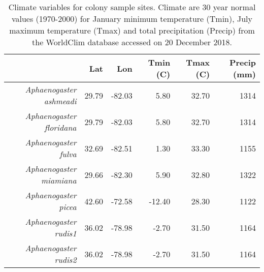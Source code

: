 \begin{table}[ht]
\centering
\begin{tabular}{rrrrrr}
  \hline
 & Lat & Lon & Tmin (C) & Tmax (C) & Precip (mm) \\ 
  \hline
{\emph{Aphaenogaster ashmeadi}} & 29.79 & -82.03 & 5.80 & 32.70 & 1314 \\ 
  {\emph{Aphaenogaster floridana}} & 29.79 & -82.03 & 5.80 & 32.70 & 1314 \\ 
  {\emph{Aphaenogaster fulva}} & 32.69 & -82.51 & 1.30 & 33.30 & 1155 \\ 
  {\emph{Aphaenogaster miamiana}} & 29.66 & -82.30 & 5.90 & 32.80 & 1322 \\ 
  {\emph{Aphaenogaster picea}} & 42.60 & -72.58 & -12.40 & 28.30 & 1122 \\ 
  {\emph{Aphaenogaster rudis1}} & 36.02 & -78.98 & -2.70 & 31.50 & 1164 \\ 
  {\emph{Aphaenogaster rudis2}} & 36.02 & -78.98 & -2.70 & 31.50 & 1164 \\ 
   \hline
\end{tabular}
\caption{Climate variables for colony sample sites. Climate are 30 year normal values (1970-2000) for January minimum temperature (Tmin), July maximum temperature (Tmax) and total precipitation (Precip) from the WorldClim database accessed on 20 December 2018.} 
\label{tab:climate}
\end{table}
